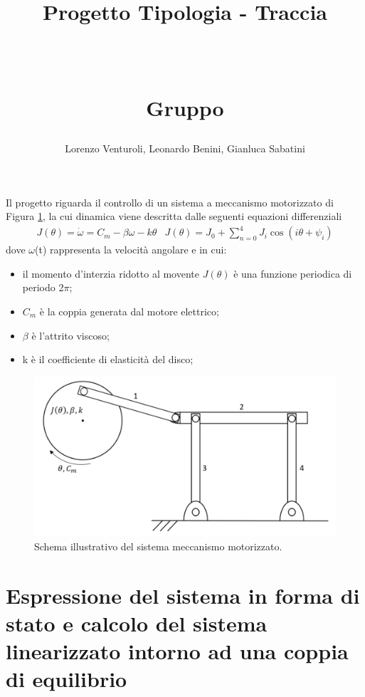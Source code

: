 \documentclass[a4paper, 11pt]{article}
\title{ \vspace{-1in}
		\huge \strut \coursename \strut 
		\\
		\Large  \strut Progetto Tipologia \tipology - Traccia \trace 
		\\
		\Large  \strut \projectname\strut
		\\
		\Large  \strut Gruppo \group\strut
		\vspace{-0.4cm}
}
\author{Lorenzo Venturoli, Leonardo Benini, Gianluca Sabatini}
\date{}
\begin{document}
\maketitle
\vspace{-0.5cm}

Il progetto riguarda il controllo di un sistema a meccanismo motorizzato di Figura \ref{fig:system_image}, la cui dinamica viene descritta dalle seguenti equazioni differenziali  
%
\begin{subequations}\label{eq:system}
	\begin{align}
		J(\theta) = \dot{\omega} = C_m - \beta\omega - k\theta 
	\end{align}
	\begin{align}
		J(\theta) = J_0 + \sum_{n = 0}^{4}J_i\cos (i\theta +\psi_i)
	\end{align}
\end{subequations}
%
dove $\omega$(t) rappresenta la velocità angolare e in cui:
\begin{itemize}
	\item il momento d'interzia ridotto al movente $J(\theta)$ è una funzione periodica di periodo 2$\pi$;
	\item $C_m$ è la coppia generata dal motore elettrico;
	\item $\beta$ è l'attrito viscoso;
	\item k è il coefficiente di elasticità del disco;
\end{itemize}
%
\begin{figure}[h!]
	\centering
	\includegraphics[width=0.75\linewidth]{./images/system_image.png}
	\caption{Schema illustrativo del sistema meccanismo motorizzato.}
	\label{fig:system_image}
\end{figure}
\section{Espressione del sistema in forma di stato e calcolo del sistema linearizzato intorno ad una coppia di equilibrio}
\end{document}

